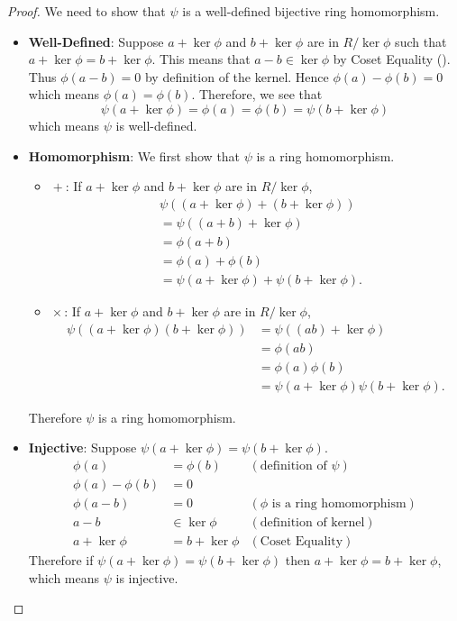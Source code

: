 \begin{proof}
    We need to show that $\psi$ is a well-defined bijective ring homomorphism.
    \begin{itemize}
        \item \textbf{Well-Defined}: Suppose $a + \ker\phi$ and $b + \ker\phi$ are in $R/\ker\phi$ such that $a + \ker\phi = b+\ker\phi$. This means that $a - b \in \ker\phi$ by Coset Equality (). Thus $\phi(a-b) = 0$ by definition of the kernel. Hence $\phi(a) - \phi(b) = 0$ which means $\phi(a) = \phi(b)$. Therefore, we see that
        \[
            \psi(a + \ker\phi) = \phi(a) = \phi(b) = \psi(b + \ker\phi)
        \]
        which means $\psi$ is well-defined.

        \item \textbf{Homomorphism}: We first show that $\psi$ is a ring homomorphism.
        \begin{itemize}
            \item $\boxed{+}$: If $a + \ker\phi$ and $b + \ker\phi$ are in $R/\ker\phi$,
            \begin{align*}
                &\psi((a + \ker\phi)+(b+\ker\phi))\\
                &= \psi((a+b)+\ker\phi)\\
                &= \phi(a+b)\\
                &= \phi(a) + \phi(b)\\
                &= \psi(a + \ker\phi) + \psi(b + \ker\phi).
            \end{align*}
            \item $\boxed{\times}$: If $a + \ker\phi$ and $b + \ker\phi$ are in $R/\ker\phi$,
            \begin{align*}
                \psi((a + \ker\phi)(b+\ker\phi)) &= \psi((ab)+\ker\phi)\\
                &= \phi(ab)\\
                &= \phi(a)\phi(b)\\
                &= \psi(a + \ker\phi)\psi(b + \ker\phi).
            \end{align*}
        \end{itemize}
        Therefore $\psi$ is a ring homomorphism.

        \item \textbf{Injective}: Suppose $\psi(a+\ker\phi) = \psi(b+\ker\phi)$.
        \begin{align*}
            \phi(a) &= \phi(b) & (\text{definition of }\psi)\\
            \phi(a) - \phi(b) &= 0\\
            \phi(a-b) &= 0 & (\phi \text{ is a ring homomorphism})\\
            a - b &\in \ker\phi & (\text{definition of kernel})\\
            a + \ker\phi &= b + \ker\phi & (\text{Coset Equality})
        \end{align*}
        Therefore if $\psi(a+\ker\phi) = \psi(b+\ker\phi)$ then $a+\ker\phi = b+\ker\phi$, which means $\psi$ is injective.


\end{itemize}
\end{proof}
